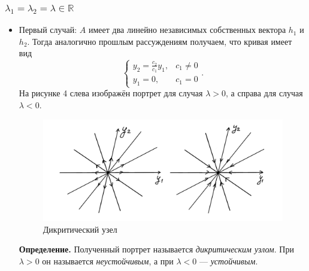 \subsubsection{$\lambda_1 = \lambda_2 = \lambda \in \mathbb R$}
\begin{itemize}
\item Первый случай: $A$ имеет два линейно независимых собственных вектора $h_1$ и $h_2$.
Тогда аналогично прошлым рассуждениям получаем, что кривая имеет вид
\[
    \begin{cases}
        y_2 = \frac{c_2}{c_1} y_1, & c_1 \ne 0 \\
        y_1 = 0, & c_1 = 0
    \end{cases}.
\]
На рисунке 4 слева изображён портрет для случая $\lambda > 0$, а справа для случая $\lambda < 0$.

\begin{figure}[h]
    \includegraphics[scale=0.25]{dicritical-knot}
    \centering
    \caption{Дикритический узел}
\end{figure}

\textbf{Определение.} Полученный портрет называется \textit{дикритическим узлом}.
При $\lambda > 0$ он называется \textit{неустойчивым}, а при $\lambda < 0$ --- \textit{устойчивым}.


\end{itemize}
